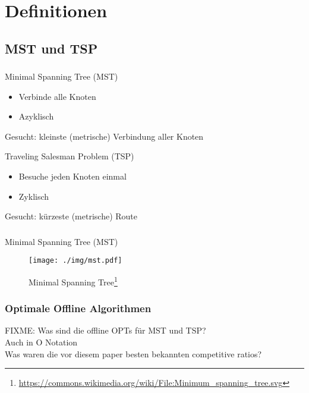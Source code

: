 \section{Definitionen}
\subsection{MST und TSP}

\begin{frame}
    \frametitle{\insertsubsection}
    \begin{block}{Minimal Spanning Tree (MST)}
        \vspace{1em}
        \begin{itemize}
            \itemsep\setlength{.8em}
            \item Verbinde alle Knoten
            \item Azyklisch
        \end{itemize}
        Gesucht: kleinste (metrische) Verbindung aller Knoten
    \end{block}
    \vspace{1em}
    \begin{block}{Traveling Salesman Problem (TSP)}
        \vspace{1em}
        \begin{itemize}
            \itemsep\setlength{.8em}
            \item Besuche jeden Knoten einmal
            \item Zyklisch
        \end{itemize}
        Gesucht: kürzeste (metrische) Route
    \end{block}
\end{frame}

\begin{frame}
    \frametitle{\insertsubsection}
    Minimal Spanning Tree (MST)
    \begin{figure}
        \centering
        \texttt{[image: ./img/mst.pdf]}
        \caption{Minimal Spanning Tree\footnote{\url{https://commons.wikimedia.org/wiki/File:Minimum_spanning_tree.svg}}}
    \end{figure}
\end{frame}

\begin{frame}
    \frametitle{Optimale Offline Algorithmen}
    FIXME: Was sind die offline OPTs für MST und TSP?\\
    Auch in O Notation\\
    Was waren die vor diesem paper besten bekannten competitive ratios?
\end{frame}

